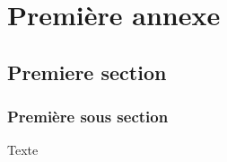 
\chapter{Première annexe}

\section{Premiere section}
%
\subsection{Première sous section}

Texte

